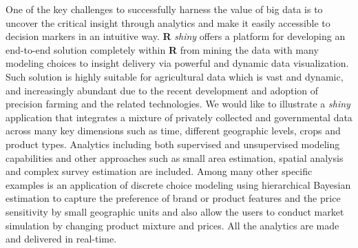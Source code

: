 \documentclass[\main/boa.tex]{subfiles}
\begin{document}
One of the key challenges to successfully harness the value of big data
is to uncover the critical insight through analytics and make it easily
accessible to decision markers in an intuitive way. \textbf{R}
\emph{shiny} offers a platform for developing an end-to-end solution
completely within \textbf{R} from mining the data with many modeling
choices to insight delivery via powerful and dynamic data visualization.
Such solution is highly suitable for agricultural data which is vast and
dynamic, and increasingly abundant due to the recent development and
adoption of precision farming and the related technologies. We would
like to illustrate a \emph{shiny} application that integrates a mixture
of privately collected and governmental data across many key dimensions
such as time, different geographic levels, crops and product types.
Analytics including both supervised and unsupervised modeling
capabilities and other approaches such as small area estimation, spatial
analysis and complex survey estimation are included. Among many other
specific examples is an application of discrete choice modeling using
hierarchical Bayesian estimation to capture the preference of brand or
product features and the price sensitivity by small geographic units and
also allow the users to conduct market simulation by changing product
mixture and prices. All the analytics are made and delivered in
real-time.
\end{document}
